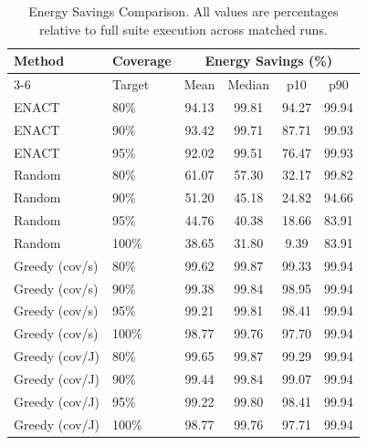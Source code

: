 \begin{table}[t]
  \caption{Energy Savings Comparison. All values are percentages relative
  to full suite execution across matched runs.}
  \label{tab:baseline-comparison}
  \centering
  \begin{tabular}{llcccc}
    \toprule
    Method & Coverage & \multicolumn{4}{c}{Energy Savings (\%)} \\
    \cmidrule(lr){3-6}
    & Target & Mean & Median & p10 & p90 \\
    \midrule
    ENACT & 80\% & 94.13 & 99.81 & 94.27 & 99.94 \\
    ENACT & 90\% & 93.42 & 99.71 & 87.71 & 99.93 \\
    ENACT & 95\% & 92.02 & 99.51 & 76.47 & 99.93 \\
    \midrule
    Random & 80\% & 61.07 & 57.30 & 32.17 & 99.82 \\
    Random & 90\% & 51.20 & 45.18 & 24.82 & 94.66 \\
    Random & 95\% & 44.76 & 40.38 & 18.66 & 83.91 \\
    Random & 100\% & 38.65 & 31.80 & 9.39 & 83.91 \\
    \midrule
    Greedy (cov/s) & 80\% & 99.62 & 99.87 & 99.33 & 99.94 \\
    Greedy (cov/s) & 90\% & 99.38 & 99.84 & 98.95 & 99.94 \\
    Greedy (cov/s) & 95\% & 99.21 & 99.81 & 98.41 & 99.94 \\
    Greedy (cov/s) & 100\% & 98.77 & 99.76 & 97.70 & 99.94 \\
    \midrule
    Greedy (cov/J) & 80\% & 99.65 & 99.87 & 99.29 & 99.94 \\
    Greedy (cov/J) & 90\% & 99.44 & 99.84 & 99.07 & 99.94 \\
    Greedy (cov/J) & 95\% & 99.22 & 99.80 & 98.41 & 99.94 \\
    Greedy (cov/J) & 100\% & 98.77 & 99.76 & 97.71 & 99.94 \\
    \bottomrule
  \end{tabular}
\end{table}

